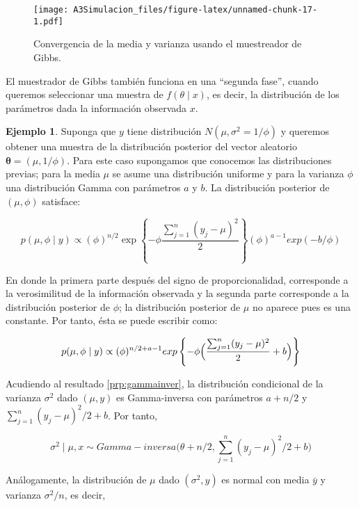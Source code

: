 \documentclass[
  12pt,
  spanish,
]{book}
\theoremstyle{definition}
\theoremstyle{definition}
\newtheorem{example}{Ejemplo}[chapter]
\theoremstyle{definition}
\theoremstyle{definition}
\theoremstyle{remark}
\begin{document}
\begin{figure}
\centering
\texttt{[image: A3Simulacion\_files/figure-latex/unnamed-chunk-17-1.pdf]}
\caption{\label{fig:unnamed-chunk-17}Convergencia de la media y varianza usando el muestreador de Gibbs.}
\end{figure}

El muestrador de Gibbs también funciona en una ``segunda fase'', cuando queremos seleccionar una muestra de \(f(\theta\mid x)\), es decir, la distribución de los parámetros dada la información observada \(x\).

\begin{example}
\protect\hypertarget{exm:GibbsN2}{}{\label{exm:GibbsN2} }Suponga que \(y\) tiene distribución \(N(\mu,\sigma^2=1/\phi)\) y queremos obtener una muestra de la distribución posterior del vector aleatorio \(\boldsymbol \theta=(\mu,1/\phi)\). Para este caso supongamos que conocemos las distribuciones previas; para la media \(\mu\) se asume una distribución uniforme y para la varianza \(\phi\) una distribución Gamma con parámetros \(a\) y \(b\). La distribución posterior de \((\mu, \phi)\) satisface:

\begin{equation}  
p(\mu, \phi \mid y) \propto (\phi)^{n/2}
\exp\left\{-\phi
\frac{\sum_{j=1}^n(y_j-\mu)^2}{2}\right\}(\phi)^{a-1}exp(-b/\phi)
\end{equation}

En donde la primera parte después del signo de proporcionalidad, corresponde a la verosimilitud de la información observada y la segunda parte corresponde a la distribución posterior de \(\phi\); la distribución posterior de \(\mu\) no
aparece pues es una constante. Por tanto, ésta se puede escribir como:

\begin{equation*}  
p(\mu, \phi \mid y)\propto(\phi)^{n/2+a-1}exp\left\{-\phi\Bigl(\frac{\sum_{j=1}^n(y_j-\mu)^2}{2}+b\Bigl)\right\}
\end{equation*}

Acudiendo al resultado \ref{prp:gammainver}, la distribución condicional de la varianza \(\sigma^2\) dado \((\mu, y)\) es Gamma-inversa con parámetros \(a+n/2\) y \(\sum_{j=1}^n(y_j-\mu)^2/2+b\). Por tanto,

\begin{equation} 
\label{eq:apmunormal}
\sigma^2\mid\mu,x\sim Gamma-inversa\biggl(\theta+n/2,\sum_{j=1}^n(y_j-\mu)^2/2+b\biggl)
\end{equation}

Análogamente, la distribución de \(\mu\) dado \((\sigma^2, y)\) es normal
con media \(\bar{y}\) y varianza \(\sigma^2/n\), es decir,


\end{example}
\end{document}
